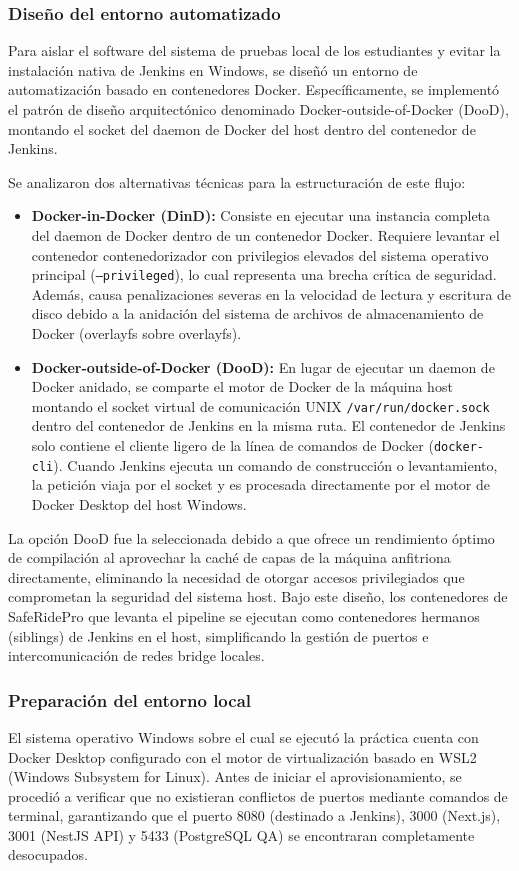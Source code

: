 \documentclass{article}
\begin{document}
\subsubsection{Diseño del entorno automatizado}
Para aislar el software del sistema de pruebas local de los estudiantes y evitar la instalación nativa de Jenkins en Windows, se diseñó un entorno de automatización basado en contenedores Docker. Específicamente, se implementó el patrón de diseño arquitectónico denominado Docker-outside-of-Docker (DooD), montando el socket del daemon de Docker del host dentro del contenedor de Jenkins.

Se analizaron dos alternativas técnicas para la estructuración de este flujo:
\begin{itemize}[leftmargin=*]
    \item \textbf{Docker-in-Docker (DinD):} Consiste en ejecutar una instancia completa del daemon de Docker dentro de un contenedor Docker. Requiere levantar el contenedor contenedorizador con privilegios elevados del sistema operativo principal (\texttt{--privileged}), lo cual representa una brecha crítica de seguridad. Además, causa penalizaciones severas en la velocidad de lectura y escritura de disco debido a la anidación del sistema de archivos de almacenamiento de Docker (overlayfs sobre overlayfs).
    \item \textbf{Docker-outside-of-Docker (DooD):} En lugar de ejecutar un daemon de Docker anidado, se comparte el motor de Docker de la máquina host montando el socket virtual de comunicación UNIX \texttt{/var/run/docker.sock} dentro del contenedor de Jenkins en la misma ruta. El contenedor de Jenkins solo contiene el cliente ligero de la línea de comandos de Docker (\texttt{docker-cli}). Cuando Jenkins ejecuta un comando de construcción o levantamiento, la petición viaja por el socket y es procesada directamente por el motor de Docker Desktop del host Windows.
\end{itemize}

La opción DooD fue la seleccionada debido a que ofrece un rendimiento óptimo de compilación al aprovechar la caché de capas de la máquina anfitriona directamente, eliminando la necesidad de otorgar accesos privilegiados que comprometan la seguridad del sistema host. Bajo este diseño, los contenedores de SafeRidePro que levanta el pipeline se ejecutan como contenedores hermanos (siblings) de Jenkins en el host, simplificando la gestión de puertos e intercomunicación de redes bridge locales.

\subsubsection{Preparación del entorno local}
El sistema operativo Windows sobre el cual se ejecutó la práctica cuenta con Docker Desktop configurado con el motor de virtualización basado en WSL2 (Windows Subsystem for Linux). Antes de iniciar el aprovisionamiento, se procedió a verificar que no existieran conflictos de puertos mediante comandos de terminal, garantizando que el puerto 8080 (destinado a Jenkins), 3000 (Next.js), 3001 (NestJS API) y 5433 (PostgreSQL QA) se encontraran completamente desocupados.
\end{document}
